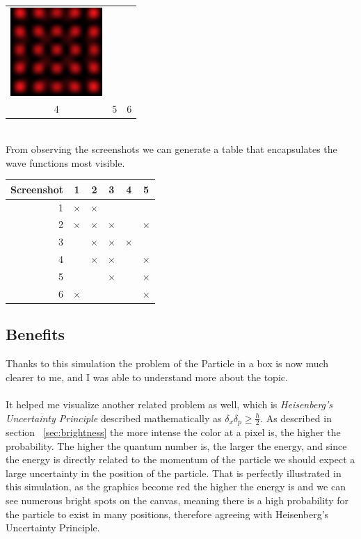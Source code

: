 \documentclass[a4paper, 10pt]{article}
\begin{document}
\begin{table}[ht]
\begin{center}
\begin{tabular}{c c c}
            \includegraphics[width=3.5cm]{graphics/result5.png} \\
            4 & 5 & 6
        \end{tabular}
        \end{center}
    \end{table}\\
    From observing the screenshots we can generate a table that encapsulates the wave functions most visible.
    \begin{table}[ht]
        \begin{center}
            \begin{tabular}{| r | c | c | c | c | c |}
            \hline
            Screenshot & 1 & 2 & 3 & 4 & 5 \\ \hline
            1 & $\times$ & $\times$ & & & \\ \hline
            2 & $\times$ & $\times$ & $\times$ & & $\times$ \\ \hline
            3 & & $\times$ & $\times$ & $\times$ & \\ \hline
            4 & & $\times$ & $\times$ & & $\times$ \\ \hline
            5 & & & $\times$ & & $\times$ \\ \hline
            6 & $\times$ & & & & $\times$ \\ \hline
            \end{tabular}
        \end{center}
    \end{table}

    \subsection{Benefits}
    Thanks to this simulation the problem of the Particle in a box is now much clearer
    to me, and I was able to understand more about the topic.\\\\
    It helped me visualize another related problem as well, which is \emph{Heisenberg's
    Uncertainty Principle} described mathematically as $\delta_x\delta_p \geq \frac{\hbar}{2}$.
    As described in section ~\ref{sec:brightness} the more intense the color at a pixel is,
    the higher the probability. The higher the quantum number is, the larger the energy, and
    since the energy is directly related to the momentum of the particle we should expect
    a large uncertainty in the position of the particle. That is perfectly illustrated in this
    simulation, as the graphics become red the higher the energy is and we can see numerous
    bright spots on the canvas, meaning there is a high probability for the particle to exist
    in many positions, therefore agreeing with Heisenberg's Uncertainty Principle.
\end{document}
